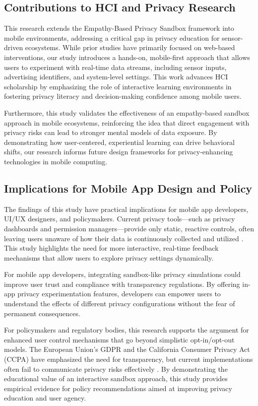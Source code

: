\documentclass[acmlarge, nonacm]{acmart}
\begin{document}
\subsection{Contributions to HCI and Privacy Research}

This research extends the Empathy-Based Privacy Sandbox framework into mobile environments, addressing a critical gap in privacy education for sensor-driven ecosystems. While prior studies have primarily focused on web-based interventions, our study introduces a hands-on, mobile-first approach that allows users to experiment with real-time data streams, including sensor inputs, advertising identifiers, and system-level settings. This work advances HCI scholarship by emphasizing the role of interactive learning environments in fostering privacy literacy and decision-making confidence among mobile users.

Furthermore, this study validates the effectiveness of an empathy-based sandbox approach in mobile ecosystems, reinforcing the idea that direct engagement with privacy risks can lead to stronger mental models of data exposure. By demonstrating how user-centered, experiential learning can drive behavioral shifts, our research informs future design frameworks for privacy-enhancing technologies in mobile computing.

\subsection{Implications for Mobile App Design and Policy}
The findings of this study have practical implications for mobile app developers, UI/UX designers, and policymakers. Current privacy tools—such as privacy dashboards and permission managers—provide only static, reactive controls, often leaving users unaware of how their data is continuously collected and utilized \cite{al-muhander2023}. This study highlights the need for more interactive, real-time feedback mechanisms that allow users to explore privacy settings dynamically.

For mobile app developers, integrating sandbox-like privacy simulations could improve user trust and compliance with transparency regulations. By offering in-app privacy experimentation features, developers can empower users to understand the effects of different privacy configurations without the fear of permanent consequences.

For policymakers and regulatory bodies, this research supports the argument for enhanced user control mechanisms that go beyond simplistic opt-in/opt-out models. The European Union’s GDPR and the California Consumer Privacy Act (CCPA) have emphasized the need for transparency, but current implementations often fail to communicate privacy risks effectively \cite{GDPR}. By demonstrating the educational value of an interactive sandbox approach, this study provides empirical evidence for policy recommendations aimed at improving privacy education and user agency.
\end{document}
